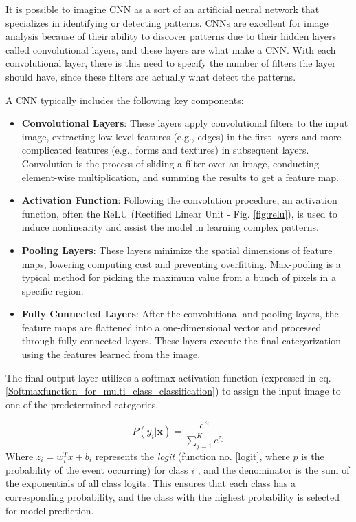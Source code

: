 \documentclass[conference]{IEEEtran}
\begin{document}
It is possible to imagine \ac{CNN} as a sort of an artificial neural network that specializes in identifying or detecting patterns. CNNs are excellent for image analysis because of their ability to discover patterns due to their hidden layers called convolutional layers, and these layers are what make a \ac{CNN}. With each convolutional layer, there is this need to specify the number of filters the layer should have, since these filters are actually what detect the patterns.

A CNN typically includes the following key components:

\begin{itemize}
    \item \textbf{Convolutional Layers}: These layers apply convolutional filters to the input image, extracting low-level features (e.g., edges) in the first layers and more complicated features (e.g., forms and textures) in subsequent layers. Convolution is the process of sliding a filter over an image, conducting element-wise multiplication, and summing the results to get a feature map.

    \item \textbf{Activation Function}: Following the convolution procedure, an activation function, often the ReLU (Rectified Linear Unit - Fig. \ref{fig:relu}), is used to induce nonlinearity and assist the model in learning complex patterns.

    \item \textbf{Pooling Layers}: These layers minimize the spatial dimensions of feature maps, lowering computing cost and preventing overfitting. Max-pooling is a typical method for picking the maximum value from a bunch of pixels in a specific region.

    \item \textbf{Fully Connected Layers}: After the convolutional and pooling layers, the feature maps are flattened into a one-dimensional vector and processed through fully connected layers. These layers execute the final categorization using the features learned from the image.
\end{itemize}

The final output layer utilizes a softmax activation function \cite{softmaxactivation} (expressed in eq. \ref{Softmaxfunction_for_multi_class_classification}) to assign the input image to one of the predetermined categories.

\begin{equation}
    P(y_i | \mathbf{x}) = \frac{e^{z_i}}{\sum_{j=1}^{K} e^{z_j}}
    \label{Softmaxfunction_for_multi_class_classification}
\end{equation}
Where \( z_i = w_i^T x + b_i \) represents the \textit{logit} (function no. \ref{logit}, where \( p \) is the probability of the event occurring) for class \( i \) , and the denominator is the sum of the exponentials of all class logits. This ensures that each class has a corresponding probability, and the class with the highest probability is selected for model prediction.
\end{document}
